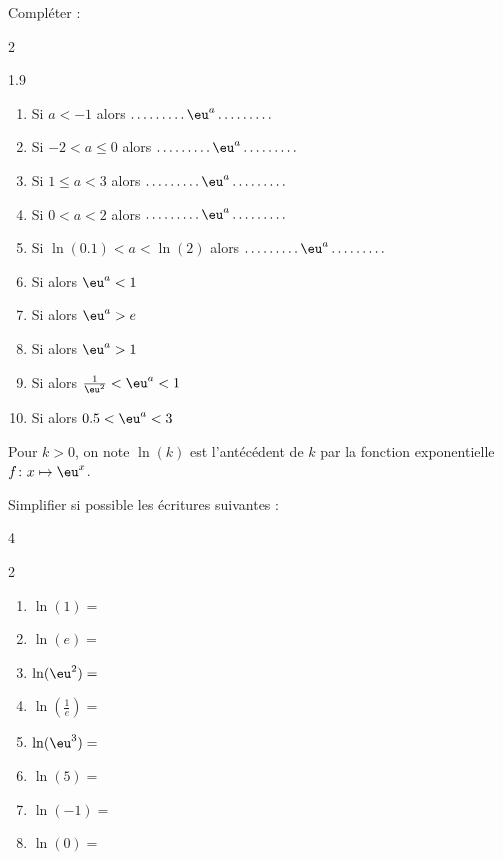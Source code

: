 \documentclass[main.tex]{subfiles}
\begin{document}
\begin{exercise} Compléter :  \hfill  
	\vspace{-0.5em}
	\begin{multicols}{2}
		\begin{spacing}{1.9} 
			\begin{enumerate}[label={}, leftmargin=*]   
				\item Si $a<-1$ alors \hfill \hfill $\ldots\ldots \ldots \eu^a \ldots  \ldots\ldots$
				\item Si $-2<a\leqslant 0$ alors \hfill \hfill $\ldots\ldots \ldots \eu^a \ldots  \ldots\ldots$
				\item Si $1\leqslant a < 3$ alors \hfill \hfill $\ldots\ldots \ldots \eu^a \ldots  \ldots\ldots$
				\item Si $0< a < 2$ alors \hfill \hfill $\ldots\ldots \ldots \eu^a \ldots  \ldots\ldots$ 
				\item  Si $\ln(0.1)< a < \ln(2)$ alors \hfill \hfill $\ldots\ldots \ldots \eu^a \ldots  \ldots\ldots$ 
				\item Si \dotfill  alors     $  \eu^a <1$ 
				\item Si \dotfill  alors     $\eu^{a}>e$ 
				\item Si \dotfill  alors     $\eu^{a}>1$ 
				\item Si \dotfill  alors     $\frac{1}{\eu^2}<\eu^{a}<1$ 
				\item   Si \dotfill  alors     $0.5<\eu^{a}<3$  
			\end{enumerate}
		\end{spacing}
	\end{multicols}	
	\vspace{-0.5em}  
\end{exercise} 
\begin{eBox}
Pour $k>0$, on note	$\ln(k)$ est l'antécédent de $k$ par la fonction exponentielle $f\colon x\mapsto \eu^x$. 
\end{eBox}
\begin{exercise}  Simplifier si possible  les écritures suivantes : 
	\vspace{-0.5em}
	\begin{multicols}{4}
		\begin{spacing}{2} 
			\begin{enumerate}[label={}, leftmargin=*]
				\item $\ln(1)=$\dotfill 
				\item $\ln(e)=$\dotfill 
				\item $\ln(\eu^2)=$\dotfill 
				\item $\ln\left(\tfrac{1}{e}\right)=$\dotfill 
				\item $\ln(\eu^3)=$\dotfill 
				\item $\ln\left(5\right)=$\dotfill 
				\item $\ln(-1)=$\dotfill 
				\item $\ln(0)=$\dotfill 
			\end{enumerate}
		\end{spacing} 
	\end{multicols}  
\end{exercise}  
\end{document}
